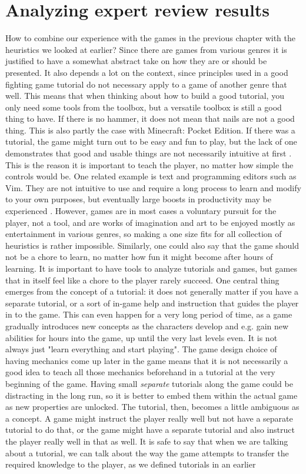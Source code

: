 \chapter{Analyzing expert review results}

How to combine our experience with the games in the previous chapter with the heuristics we looked at earlier? Since there are games from various genres it is justified to have a somewhat abstract take on how they are or should be presented. It also depends a lot on the context, since principles used in a good fighting game tutorial do not necessary apply to a game of another genre that well. This means that when thinking about how to build a good tutorial, you only need some tools from the toolbox, but a versatile toolbox is still a good thing to have. If there is no hammer, it does not mean that nails are not a good thing. This is also partly the case with Minecraft: Pocket Edition. If there was a tutorial, the game might turn out to be easy and fun to play, but the lack of one demonstrates that good and usable things are not necessarily intuitive at first \cite{Raskin1994}. This is the reason it is important to teach the player, no matter how simple the controls would be. One related example is text and programming editors such as Vim. They are not intuitive to use and require a long process to learn and modify to your own purposes, but eventually large boosts in productivity may be experienced \cite{Robbins2008}. However, games are in most cases a voluntary pursuit for the player, not a tool, and are works of imagination and art to be enjoyed mostly as entertainment in various genres, so making a one size fits for all collection of heuristics is rather impossible. Similarly, one could also say that the game should not be a chore to learn, no matter how fun it might become after hours of learning. It is important to have tools to analyze tutorials and games, but games that in itself feel like a chore to the player rarely succeed. One central thing emerges from the concept of a tutorial: it does not generally matter if you have a separate tutorial, or a sort of in-game help and instruction that guides the player in to the game. This can even happen for a very long period of time, as a game gradually introduces new concepts as the characters develop and e.g. gain new abilities for hours into the game, up until the very last levels even. It is not always just "learn everything and start playing". The game design choice of having mechanics come up later in the game means that it is not necessarily a good idea to teach all those mechanics beforehand in a tutorial at the very beginning of the game. Having small \textit{separate} tutorials along the game could be distracting in the long run, so it is better to embed them within the actual game as new properties are unlocked. The tutorial, then, becomes a little ambiguous as a concept. A game might instruct the player really well but not have a separate tutorial to do that, or the game might have a separate tutorial and also instruct the player really well in that as well. It is safe to say that when we are talking about a tutorial, we can talk about the way the game attempts to transfer the required knowledge to the player, as we defined tutorials in an earlier 